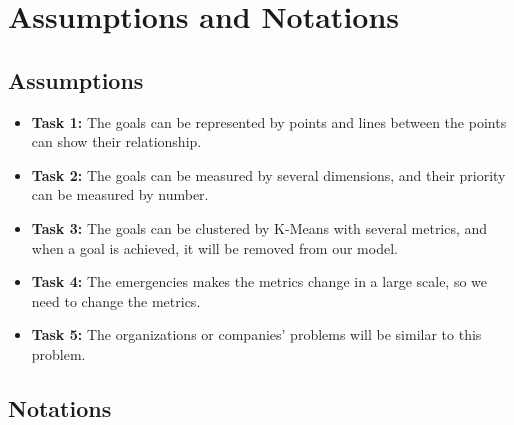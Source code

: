 \section{Assumptions and Notations}

\subsection{Assumptions}

\begin{itemize}
    \item \textbf{Task 1:} The goals can be represented by points and lines between the points can show their relationship.
    
  
    \item \textbf{Task 2:} The goals can be measured by several dimensions, and their priority can be measured by number.

    \item \textbf{Task 3:} The goals can be clustered by K-Means with several metrics, and when a goal is achieved, it will be removed from our model.
    
    
    
    \item \textbf{Task 4:} The emergencies makes the metrics change in a large scale, so we need to change the metrics. 
    
    \item \textbf{Task 5:} The organizations or companies' problems will be similar to this problem.




\end{itemize}

    


\subsection{Notations}

